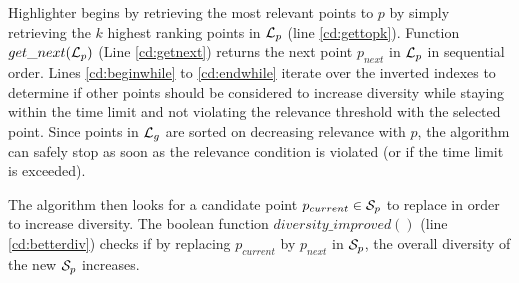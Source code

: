 
{\sc Highlighter} begins by retrieving the most relevant points to $p$ by simply retrieving the $k$ highest ranking points in ${\cal L}_p$ (line \ref{cd:gettopk}). Function $get\_next({\cal L}_p)$ (Line \ref{cd:getnext}) returns the next point $p_{next}$ in ${\cal L}_p$ in sequential order. Lines \ref{cd:beginwhile} to \ref{cd:endwhile} iterate over the inverted indexes to determine if other points should be considered to increase diversity while staying within the time limit and not violating the relevance threshold with the selected point. Since points in ${\cal L}_g$ are sorted on decreasing relevance with $p$, the algorithm can safely stop as soon as the relevance condition is violated (or if the time limit is exceeded).

The algorithm then looks for a candidate point $p_{current} \in {\cal S}_p$ to replace in order to increase diversity. The boolean function $\mathit{diversity\_improved}()$ (line \ref{cd:betterdiv}) checks if by replacing $p_{current}$ by $p_{next}$ in ${\cal S}_p$, the overall diversity of the new ${\cal S}_p$ increases.

